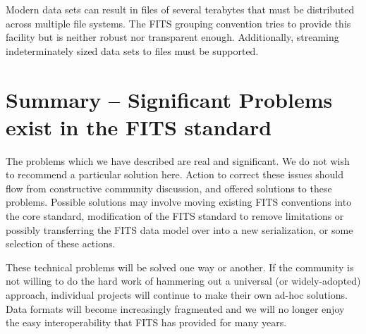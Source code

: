 \documentclass[11pt,twoside]{article}
\begin{document}
Modern data sets can result in files of several terabytes that must be
distributed across multiple file systems. The FITS grouping convention
tries to provide this facility but is neither robust nor transparent
enough. Additionally, streaming indeterminately sized data sets
to files must be supported.


\section{Summary -- Significant Problems exist in the FITS standard}

The problems which we have described are real and significant. We
do not wish to recommend a particular solution here. Action to correct
these issues should flow from constructive community discussion, and
offered solutions to these problems. Possible solutions may involve
moving existing FITS conventions into the core standard,
modification of the FITS standard to remove limitations or possibly
transferring the FITS data model over into a new serialization, or
some selection of these actions.

These technical problems will be solved one way or another. If the
community is not willing to do the hard work of hammering out a
universal (or widely-adopted) approach, individual projects will
continue to make their own ad-hoc solutions. Data formats will become
increasingly fragmented and we will no longer enjoy the easy
interoperability that FITS has provided for many years.



\end{document}
